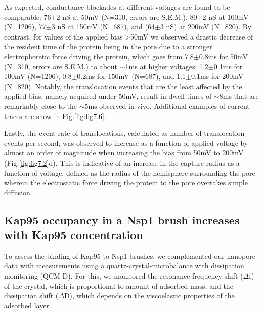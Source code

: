 As expected, conductance blockades at different voltages are found to be comparable: 76$\pm$2 nS at 50mV (N=310, errors are S.E.M.), 80$\pm$2 nS at 100mV (N=1206), 77$\pm$3 nS at 150mV (N=687), and (64$\pm$3 nS) at 200mV (N=820). By contrast, for values of the applied bias >50mV we observed a drastic decrease of the resident time of the protein being in the pore due to a stronger electrophoretic force driving the protein, which goes from 7.8$\pm$0.8ms for 50mV (N=310, errors are S.E.M.) to about $\sim$1ms at higher voltages: 1.2$\pm$0.1ms for 100mV (N=1206), 0.8$\pm$0.2ms for 150mV (N=687), and 1.1$\pm$0.1ms for 200mV (N=820). Notably, the translocation events that are the least affected by the applied bias, namely acquired under 50mV, result in dwell times of $\sim$8ms that are remarkably close to the $\sim$5ms observed in vivo. Additional examples of current traces are show in Fig.\ref{fig:fig7.6}.

Lastly, the event rate of translocations, calculated as number of translocation events per second, was observed to increase as a function of applied voltage by almost an order of magnitude when increasing the bias from 50mV to 200mV (Fig.\ref{fig:fig7.2}d). This is indicative of an increase in the capture radius as a function of voltage\cite{Otto2013}, defined as the radius of the hemisphere surrounding the pore wherein the electrostatic force driving the protein to the pore overtakes simple diffusion.


\subsection{Kap95 occupancy in a Nsp1 brush increases with Kap95 concentration}
To assess the binding of Kap95 to Nsp1 brushes, we complemented our nanopore data with measurements using a quartz-crystal-microbalance with dissipation monitoring (QCM-D). For this, we monitored the resonance frequency shift ($\Delta$f) of the crystal, which is proportional to amount of adsorbed mass, and the dissipation shift ($\Delta$D), which depends on the viscoelastic properties of the adsorbed layer.

